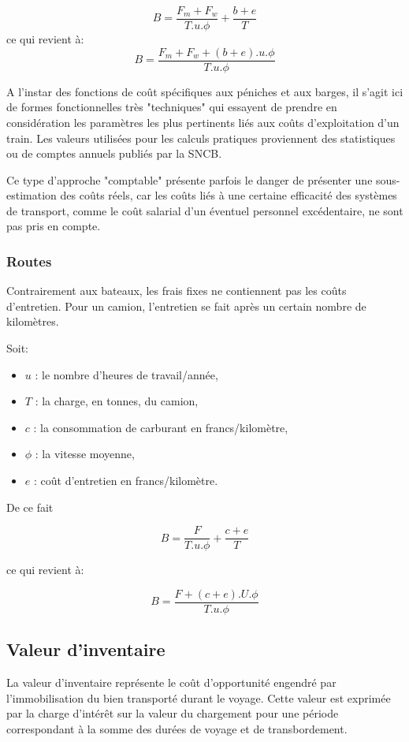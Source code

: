 $$B=\frac{F_m+F_w}{T.u.\phi} + \frac{b+e}{T}$$
ce qui revient à:
$$B=\frac{F_m+F_w+(b+e).u.\phi}{T.u.\phi}$$

A l'instar des fonctions de coût spécifiques aux péniches et aux
barges, il s'agit ici de formes fonctionnelles très "techniques"
qui essayent de prendre en considération les paramètres les plus
pertinents liés aux coûts d'exploitation d'un train. Les valeurs
utilisées pour les calculs pratiques proviennent des statistiques
ou de comptes annuels publiés par la SNCB.

Ce type d'approche "comptable" présente parfois le danger de présenter une
sous-estimation des coûts réels, car les coûts liés à une certaine efficacité
des systèmes de transport, comme le coût salarial d'un éventuel personnel
excéden\-tai\-re, ne sont pas pris en compte.


\subsubsection{Routes}

Contrairement aux bateaux, les frais fixes ne contiennent pas les
coûts d'entretien. Pour un camion, l'entretien se fait après un
certain nombre de kilomètres.

Soit:

\begin{itemize}
\item $u$ : le nombre d'heures de travail/année,
\item $T$ : la charge, en tonnes, du camion,
\item $c$ : la consommation de carburant en francs/kilomètre,
\item $\phi$ : la vitesse moyenne,
\item $e$ : coût d'entretien en francs/kilomètre.
\end{itemize}

De ce fait

$$B=\frac{F}{T.u.\phi}+\frac{c+e}{T}$$

ce qui revient à:

$$B=\frac{F+(c+e).U.\phi}{T.u.\phi}$$


\subsection{Valeur d'inventaire}

La valeur d'inventaire représente le coût d'opportunité engendré
par l'immobili\-sation du bien transporté durant le voyage. Cette
valeur est exprimée par la charge d'intérêt sur la valeur du
chargement pour une période correspondant à la somme des durées de
voyage et de transbordement.

